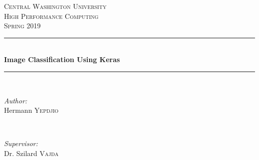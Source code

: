 \documentclass[12pt]{article}
\begin{document}
	
	\begin{titlepage}
		
		\newcommand{\HRule}{\rule{\linewidth}{0.5mm}} %
		
		\center %
		
		
		\textsc{\LARGE Central Washington University}\\[1.5cm] %
		\textsc{\Large High Performance Computing}\\[0.5cm] %
		\textsc{\large Spring 2019}\\[0.5cm] %
		
		
		\HRule \\[0.4cm]
		{ \huge \bfseries Image Classification Using Keras}\\[0.4cm] %
		\HRule \\[1.5cm]
		
		
		\begin{minipage}{0.4\textwidth}
			\begin{flushleft} \large
				\emph{Author:}\\
				Hermann \textsc{Yepdjio} %
			\end{flushleft}
		\end{minipage}
		~
		\begin{minipage}{0.4\textwidth}
			\begin{flushright} \large
				\emph{Supervisor:} \\
				Dr. Szilard \textsc{Vajda} %
			\end{flushright}
		\end{minipage}\\[0.2cm]
		

\end{titlepage}
\end{document}
